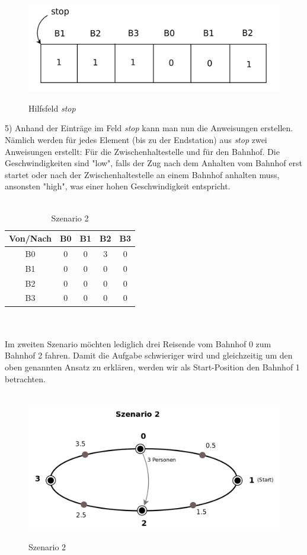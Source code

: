 \begin{figure}[H]	
\caption{Hilfsfeld \textit{stop}}
\includegraphics[width=2\textwidth, width=470pt]{content/images/stop1.png}
\label{pic:stop1}
\end{figure}
5) Anhand der Einträge im Feld \textit{stop} kann man nun die Anweisungen erstellen. Nämlich werden für jedes Element (bis zu der Endstation) aus \textit{stop} zwei Anweisungen erstellt: Für die Zwischenhaltestelle und für den Bahnhof. Die Geschwindigkeiten sind "low", falls der Zug nach dem Anhalten vom Bahnhof erst startet oder nach der Zwischenhaltestelle an einem Bahnhof anhalten muss, ansonsten "high", was einer hohen Geschwindigkeit entspricht.\\
\\
\begin{table}
\caption{Szenario 2}
\center
 \begin{tabular}{|c|c|c|c|c|}
 \hline
  Von/Nach & B0 & B1 & B2 & B3 \\ \hline
  B0 & 0 & 0 & 3 & 0\\   \hline
    B1 & 0 & 0 & 0 & 0 \\   \hline
      B2 & 0 & 0 & 0 & 0\\   \hline
        B3 & 0 & 0 & 0 & 0 \\   \hline
 \end{tabular}
\end{table}
\\
\\
Im zweiten Szenario möchten lediglich drei Reisende vom Bahnhof 0 zum Bahnhof 2 fahren. Damit die Aufgabe schwieriger wird und gleichzeitig um den oben genannten Ansatz zu erklären, werden wir als Start-Position den Bahnhof 1 betrachten.\\
\\
\begin{figure}[H]	
\caption{Szenario 2}
\includegraphics[width=2\textwidth, width=450pt]{content/images/szenario2.png}
\label{pic:szenario2}
\end{figure}
